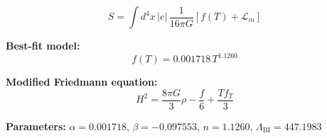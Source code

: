 
\begin{equation}
  S = \int d^4x \, |e| \, \frac{1}{16\pi G} \left[ f(T) + \mathcal{L}_m \right]
\end{equation}

\textbf{Best-fit model:}
\begin{equation}
  f(T) = 0.001718 \, T^{1.1260}
\end{equation}

\textbf{Modified Friedmann equation:}
\begin{equation}
  H^2 = \frac{8\pi G}{3} \rho - \frac{f}{6} + \frac{T f_T}{3}
\end{equation}

\textbf{Parameters:}
$\alpha = 0.001718$, \quad
$\beta = -0.097553$, \quad
$n = 1.1260$, \quad
$\Lambda_{\text{BI}} = 447.1983$